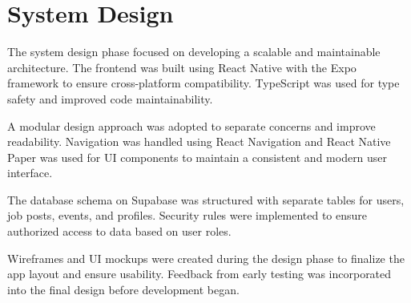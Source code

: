 \documentclass{report}
\begin{document}
\section{System Design}

The system design phase focused on developing a scalable and maintainable architecture. The frontend was built using React Native with the Expo framework to ensure cross-platform compatibility. TypeScript was used for type safety and improved code maintainability.

A modular design approach was adopted to separate concerns and improve readability. Navigation was handled using React Navigation and React Native Paper was used for UI components to maintain a consistent and modern user interface.

The database schema on Supabase was structured with separate tables for users, job posts, events, and profiles. Security rules were implemented to ensure authorized access to data based on user roles.

Wireframes and UI mockups were created during the design phase to finalize the app layout and ensure usability. Feedback from early testing was incorporated into the final design before development began.

\newpage
\end{document}
